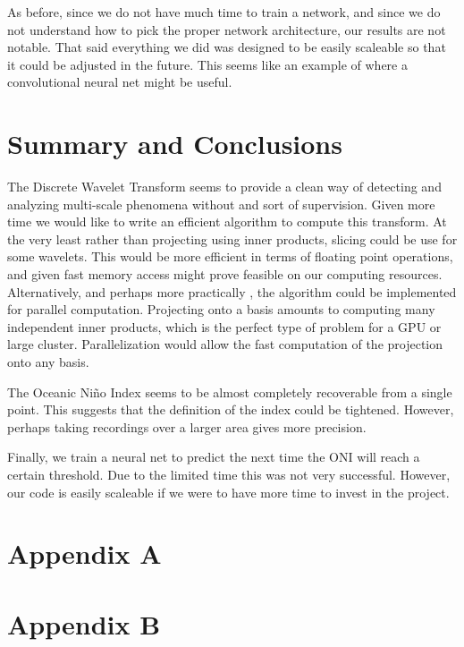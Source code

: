 \documentclass[10pt]{article}
\begin{document}
As before, since we do not have much time to train a network, and since we do not understand how to pick the proper network architecture, our results are not notable. That said everything we did was designed to be easily scaleable so that it could be adjusted in the future. This seems like an example of where a convolutional neural net might be useful.

\section{Summary and Conclusions}

The Discrete Wavelet Transform seems to provide a clean way of detecting and analyzing multi-scale phenomena without and sort of supervision. Given more time we would like to write an efficient algorithm to compute this transform. At the very least rather than projecting using inner products, slicing could be use for some wavelets. This would be more efficient in terms of floating point operations, and given fast memory access might prove feasible on our computing resources. Alternatively, and perhaps more practically , the algorithm could be implemented for parallel computation. Projecting onto a basis amounts to computing many independent inner products, which is the perfect type of problem for a GPU or large cluster. Parallelization would allow the fast computation of the projection onto any basis.

The Oceanic Ni\~no Index seems to be almost completely recoverable from a single point. This suggests that the definition of the index could be tightened. However, perhaps taking recordings over a larger area gives more precision.

Finally, we train a neural net to predict the next time the ONI will reach a certain threshold. Due to the limited time this was not very successful. However, our code is easily scaleable if we were to have more time to invest in the project.





\onecolumn
\section{Appendix A}
\label{AppendixA}



\section{Appendix B}


\end{document}
